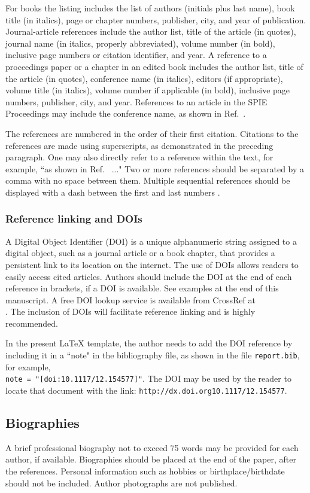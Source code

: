 For books \cite{Lamport94,Alred03,Goossens97} the listing includes the list of authors (initials plus last name), book title (in italics), page or chapter numbers, publisher, city, and year of publication.  Journal-article references \cite{Metropolis53,Harris06} include the author list, title of the article (in quotes), journal name (in italics, properly abbreviated), volume number (in bold), inclusive page numbers or citation identifier, and year.  A reference to a proceedings paper or a chapter in an edited book \cite{Gull89a} includes the author list, title of the article (in quotes), conference name (in italics), editors (if appropriate), volume title (in italics), volume number if applicable (in bold), inclusive page numbers, publisher, city, and year.  References to an article in the SPIE Proceedings may include the conference name, as shown in Ref.~.

The references are numbered in the order of their first citation. Citations to the references are made using superscripts, as demonstrated in the preceding paragraph. One may also directly refer to a reference within the text, for example, ``as shown in Ref.~ ..."  Two or more references should be separated by a comma with no space between them. Multiple sequential references should be displayed with a dash between the first and last numbers \cite{Alred03,Perelman97,Lamport94,Goossens97,Metropolis53}. 

\subsubsection{Reference linking and DOIs} 
A Digital Object Identifier (DOI) is a unique alphanumeric string assigned to a digital object, such as a journal article or a book chapter, that provides a persistent link to its location on the internet. The use of DOIs allows readers to easily access cited articles. Authors should include the DOI at the end of each reference in brackets, if a DOI is available. See examples at the end of this manuscript. A free DOI lookup service is available from CrossRef at \\. The inclusion of DOIs will facilitate reference linking and is highly recommended. 

In the present LaTeX template, the author needs to add the DOI reference by including it in a ``note" in the bibliography file, as shown in the file {\verb+report.bib+}, for example, \\ {\verb+note = "[doi:10.1117/12.154577]"+}. The DOI may be used by the reader to locate that document with the link: {\verb+http://dx.doi.org10.1117/12.154577+}. 

\subsection{Biographies} 
A brief professional biography not to exceed 75 words may be provided for each author, if available. Biographies should be placed at the end of the paper, after the references. Personal information such as hobbies or birthplace/birthdate should not be included. Author photographs are not published.

